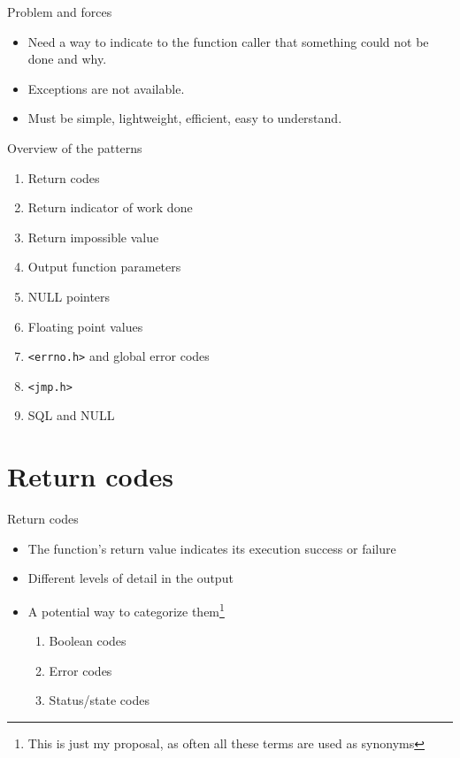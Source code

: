 \documentclass[aspectratio=169,14pt]{beamer}
\begin{document}
\begin{frame}{Problem and forces}
\begin{itemize}
    \item Need a way to indicate to the function caller that something could not be done and why.
    \item Exceptions are not available.
    \item Must be simple, lightweight, efficient, easy to understand.
\end{itemize}
\end{frame}

\begin{frame}{Overview of the patterns}
\begin{enumerate}
    \item Return codes
    \item Return indicator of work done
    \item Return impossible value
    \item Output function parameters
    \item NULL pointers
    \item Floating point values
    \item \texttt{<errno.h>} and global error codes
    \item \texttt{<jmp.h>}
    \item SQL and NULL
\end{enumerate}
\end{frame}


\section{Return codes}

\begin{frame}{Return codes}
\begin{itemize}
    \item The function's return value indicates its execution success or failure
    \item Different levels of detail in the output
    \item A potential way to categorize them\footnote{This is just my proposal, as often all these terms are used as synonyms}
    \begin{enumerate}
        \item Boolean codes
        \item Error codes
        \item Status/state codes
    \end{enumerate}
\end{itemize}
\end{frame}
\end{document}
